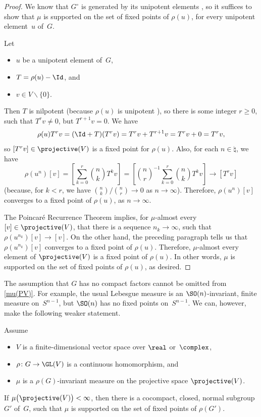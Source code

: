 \begin{proof}
 We know that $G^\circ$ is generated by its unipotent elements
, so it suffices to show that  $\mu$ is
supported on the set of fixed points of $\rho(u)$, for
every unipotent element~$u$ of~$G$.

Let 
\noprelistbreak
	\begin{itemize}
	\item $u$ be a unipotent element of~$G$, 
	\item $T = \rho(u) - \Id$,
	and
	\item $v \in V \smallsetminus \{0\}$. 
	\end{itemize}
Then $T$ is nilpotent (because $\rho(u)$ is unipotent
), so there is some integer
$r \ge 0$, such that $T^r v \neq 0$, but $T^{r+1}v = 0$.
 We have 
 $$\rho(u) T^r v 
 = (\Id + T)(T^r v)
 = T^r v + T^{r+1}v
 = T^r v + 0
 = T^r v ,$$
 so $[T^r v] \in \projective(V)$ is a fixed point for
$\rho(u)$. Also, for each $n \in \natural$, we have
 $$ \rho(u^n) [v]
 = \left[ \sum_{k=0}^r \binom{n}{k} T^k v
\right]
 = \left[ \binom{n}{r}^{-1}
 \sum_{k=0}^r \binom{n}{k} T^k v
\right]
 \to [T^r v] $$
 (because, for $k < r$, we have $\binom{n}{k}/\binom{n}{r}
\to 0$ as $n \to \infty$).
 Therefore, $\rho(u^n) [v]$ converges to a fixed point of
$\rho(u)$, as $n \to \infty$.

The Poincar\'e Recurrence Theorem  implies,
for $\mu$-almost every $[v] \in \projective(V)$, that
there is a sequence $n_k \to \infty$, such that
$\rho(u^{n_k}) [v] \to [v]$. On the other hand, the preceding paragraph tells us that $\rho(u^{n_k}) [v]$
converges to a fixed point of $\rho(u)$. Therefore,
$\mu$-almost every element of $\projective(V)$ is a fixed
point of $\rho(u)$. In other words, $\mu$ is supported on
the set of fixed points of $\rho(u)$, as desired.
 \end{proof}

The assumption that $G$ has no compact factors cannot be
omitted from \cref{mu(PV)}. For example, the usual
Lebesgue measure is an $\SO(n)$-invariant, finite
measure on~$S^{n-1}$, but $\SO(n)$ has no fixed points
on~$S^{n-1}$. We can, however, make the following weaker
statement. 

\begin{cor} \label{mu(PV)cpct}
 Assume
 \begin{itemize}
 \item $V$ is a finite-dimensional vector space over
$\real$ or~$\complex$,
 \item $\rho \colon G \to \GL(V)$ is a continuous homomorphism, and
 \item $\mu$ is a $\rho(G)$-invariant measure on the projective space $\projective(V)$.
 \end{itemize}
 If $\mu \bigl( \projective(V) \bigr) < \infty$, then there is a cocompact, closed, normal subgroup~$G'$ of~$G$, such that $\mu$ is supported on the set of fixed points of $\rho(G')$.
 \end{cor}

